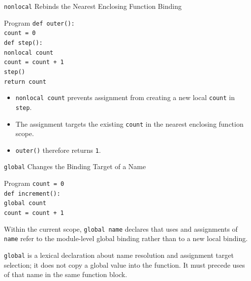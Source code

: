 \documentclass[aspectratio=169,10pt]{beamer}
\begin{document}
\begin{frame}{\texttt{nonlocal} Rebinds the Nearest Enclosing Function Binding}
  \begin{block}{Program}
    \texttt{def outer():}\\
    \hspace*{0.20in}\texttt{count = 0}\\
    \hspace*{0.20in}\texttt{def step():}\\
    \hspace*{0.40in}\texttt{nonlocal count}\\
    \hspace*{0.40in}\texttt{count = count + 1}\\
    \hspace*{0.20in}\texttt{step()}\\
    \hspace*{0.20in}\texttt{return count}
  \end{block}

  \begin{itemize}
    \item \texttt{nonlocal count} prevents assignment from creating a new local \texttt{count} in \texttt{step}.
    \item The assignment targets the existing \texttt{count} in the nearest enclosing function scope.
    \item \texttt{outer()} therefore returns \texttt{1}.
  \end{itemize}
\end{frame}


\begin{frame}{\texttt{global} Changes the Binding Target of a Name}
  \begin{block}{Program}
    \texttt{count = 0}\\[0.06in]
    \texttt{def increment():}\\
    \hspace*{0.20in}\texttt{global count}\\
    \hspace*{0.20in}\texttt{count = count + 1}
  \end{block}

  \begin{cpdefinition}
    Within the current scope, \texttt{global name} declares that uses and assignments of \texttt{name} refer to the module-level global binding rather than to a new local binding.
  \end{cpdefinition}

  \begin{keyidea}
    \texttt{global} is a lexical declaration about name resolution and assignment target selection; it does not copy a global value into the function. It must precede uses of that name in the same function block.
  \end{keyidea}
\end{frame}
\end{document}
